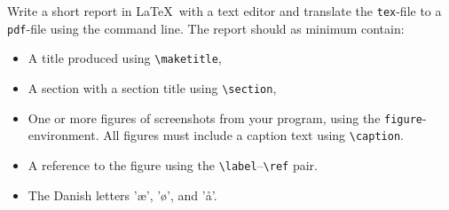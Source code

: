 Write a short report in \LaTeX\ with a text editor and translate the
\lstinline[language=console]{tex}-file to a
\lstinline[language=console]{pdf}-file using the command line. The
report should as minimum contain:
\begin{itemize}
\item A title produced using \verb!\maketitle!, 
\item A section with a section title using \verb!\section!,
\item One or more figures of screenshots from your program, using the
  \verb!figure!-environment. All figures must include a caption text
  using \verb!\caption!.
\item A reference to the figure using the
  \verb!\label!--\verb!\ref! pair.
\item The Danish letters 'æ', 'ø', and 'å'.
\end{itemize}